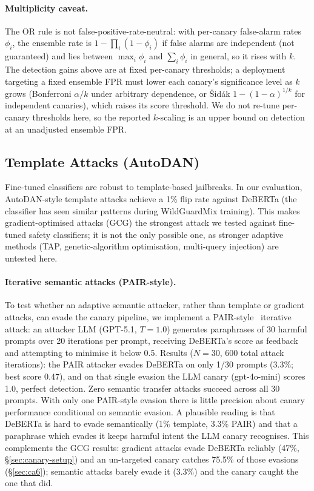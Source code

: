 \documentclass{article}
\begin{document}
\paragraph{Multiplicity caveat.} The OR rule is not false-positive-rate-neutral: with per-canary false-alarm rates $\phi_i$, the ensemble rate is $1 - \prod_i (1 - \phi_i)$ if false alarms are independent (not guaranteed) and lies between $\max_i \phi_i$ and $\sum_i \phi_i$ in general, so it rises with $k$. The detection gains above are at fixed per-canary thresholds; a deployment targeting a fixed ensemble FPR must lower each canary's significance level as $k$ grows (Bonferroni $\alpha/k$ under arbitrary dependence, or \v{S}id\'{a}k $1-(1-\alpha)^{1/k}$ for independent canaries), which raises its score threshold. We do not re-tune per-canary thresholds here, so the reported $k$-scaling is an upper bound on detection at an unadjusted ensemble FPR.

\subsection{Template Attacks (AutoDAN)}
\label{sec:autodan}

Fine-tuned classifiers are robust to template-based jailbreaks. In our evaluation, AutoDAN-style template attacks achieve a 1\% flip rate against DeBERTa (the classifier has seen similar patterns during WildGuardMix training). This makes gradient-optimised attacks (GCG) the strongest attack we tested against fine-tuned safety classifiers; it is not the only possible one, as stronger adaptive methods (TAP, genetic-algorithm optimisation, multi-query injection) are untested here.

\paragraph{Iterative semantic attacks (PAIR-style).} To test whether an adaptive semantic attacker, rather than template or gradient attacks, can evade the canary pipeline, we implement a PAIR-style~\citep{chao2023jailbreaking} iterative attack: an attacker LLM (GPT-5.1, $T{=}1.0$) generates paraphrases of 30 harmful prompts over 20 iterations per prompt, receiving DeBERTa's score as feedback and attempting to minimise it below 0.5. Results ($N{=}30$, 600 total attack iterations): the PAIR attacker evades DeBERTa on only 1/30 prompts (3.3\%; best score 0.47), and on that single evasion the LLM canary (gpt-4o-mini) scores 1.0, perfect detection. Zero semantic transfer attacks succeed across all 30 prompts. With only one PAIR-style evasion there is little precision about canary performance conditional on semantic evasion. A plausible reading is that DeBERTa is hard to evade semantically (1\% template, 3.3\% PAIR) and that a paraphrase which evades it keeps harmful intent the LLM canary recognises. This complements the GCG results: gradient attacks evade DeBERTa reliably (47\%, \S\ref{sec:canary-setup}) and an un-targeted canary catches 75.5\% of those evasions (\S\ref{sec:ca6}); semantic attacks barely evade it (3.3\%) and the canary caught the one that did.
\end{document}
